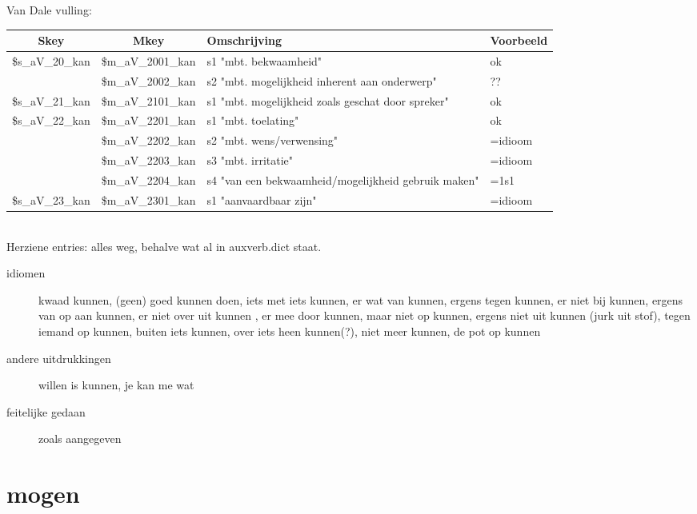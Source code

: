 Van Dale vulling:\\
\begin{tabular}[t]{|c|c|p{}|p{}|}
\hline
Skey          & Mkey              & Omschrijving & Voorbeeld\\
\hline
\$s\_aV\_20\_kan  & \$m\_aV\_2001\_kan    & s1 "mbt. bekwaamheid" & ok\\
              & \$m\_aV\_2002\_kan    & s2 "mbt. mogelijkheid inherent aan onderwerp"&??\\
\$s\_aV\_21\_kan  & \$m\_aV\_2101\_kan    & s1 "mbt. mogelijkheid zoals geschat door spreker"&ok\\
\$s\_aV\_22\_kan  & \$m\_aV\_2201\_kan    & s1 "mbt. toelating"&ok\\
              & \$m\_aV\_2202\_kan    & s2 "mbt. wens/verwensing"&=idioom\\
              & \$m\_aV\_2203\_kan    & s3 "mbt. irritatie"&=idioom\\
              & \$m\_aV\_2204\_kan    & s4 "van een bekwaamheid/mogelijkheid gebruik maken"& =1s1\\
\$s\_aV\_23\_kan  & \$m\_aV\_2301\_kan    & s1 "aanvaardbaar zijn"&=idioom\\
\hline
\end{tabular}\\



Herziene entries: alles weg, behalve wat al in auxverb.dict staat.

\begin{description}
  \item[idiomen] kwaad kunnen,  (geen) goed kunnen doen, iets met iets kunnen,
er wat van kunnen, ergens tegen kunnen, er niet bij kunnen, ergens van op aan
kunnen, er niet over uit kunnen , er mee door kunnen, maar niet op kunnen,
ergens niet uit kunnen (jurk uit stof), tegen iemand op kunnen, buiten iets
kunnen, over iets heen kunnen(?), niet meer kunnen, de pot op kunnen
  \item[andere uitdrukkingen] willen is kunnen, je kan me wat
\end{description}


\begin{description}
\item[feitelijke gedaan] zoals aangegeven
\end{description}

\newpage
\section{mogen}

